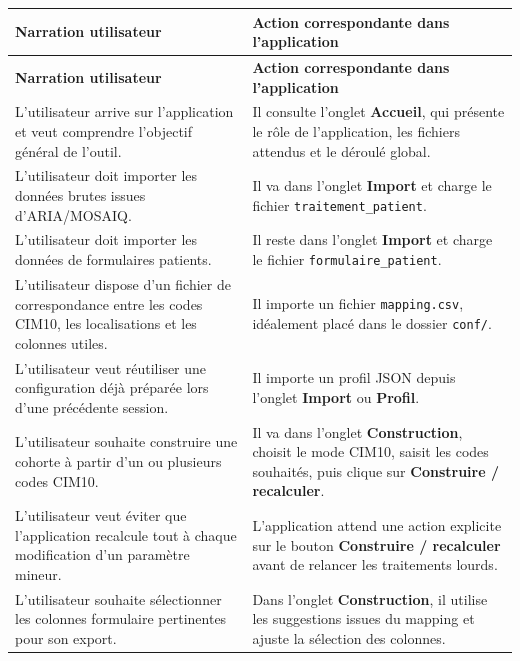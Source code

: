\documentclass[11pt,a4paper]{article}
\begin{document}
\begin{longtable}{|p{}|p{}|}
\hline
\rowcolor{lightblue}
\textbf{Narration utilisateur} & \textbf{Action correspondante dans l'application} \\
\hline
\endfirsthead

\hline
\rowcolor{lightblue}
\textbf{Narration utilisateur} & \textbf{Action correspondante dans l'application} \\
\hline
\endhead

L'utilisateur arrive sur l'application et veut comprendre l'objectif général de l'outil.
&
Il consulte l'onglet \textbf{Accueil}, qui présente le rôle de l'application, les fichiers attendus et le déroulé global.
\\
\hline

L'utilisateur doit importer les données brutes issues d'ARIA/MOSAIQ.
&
Il va dans l'onglet \textbf{Import} et charge le fichier \texttt{traitement\_patient}.
\\
\hline

L'utilisateur doit importer les données de formulaires patients.
&
Il reste dans l'onglet \textbf{Import} et charge le fichier \texttt{formulaire\_patient}.
\\
\hline

L'utilisateur dispose d'un fichier de correspondance entre les codes CIM10, les localisations et les colonnes utiles.
&
Il importe un fichier \texttt{mapping.csv}, idéalement placé dans le dossier \texttt{conf/}.
\\
\hline

L'utilisateur veut réutiliser une configuration déjà préparée lors d'une précédente session.
&
Il importe un profil JSON depuis l'onglet \textbf{Import} ou \textbf{Profil}.
\\
\hline

L'utilisateur souhaite construire une cohorte à partir d'un ou plusieurs codes CIM10.
&
Il va dans l'onglet \textbf{Construction}, choisit le mode CIM10, saisit les codes souhaités, puis clique sur \textbf{Construire / recalculer}.
\\
\hline

L'utilisateur veut éviter que l'application recalcule tout à chaque modification d'un paramètre mineur.
&
L'application attend une action explicite sur le bouton \textbf{Construire / recalculer} avant de relancer les traitements lourds.
\\
\hline

L'utilisateur souhaite sélectionner les colonnes formulaire pertinentes pour son export.
&
Dans l'onglet \textbf{Construction}, il utilise les suggestions issues du mapping et ajuste la sélection des colonnes.
\\
\hline


\end{longtable}
\end{document}
